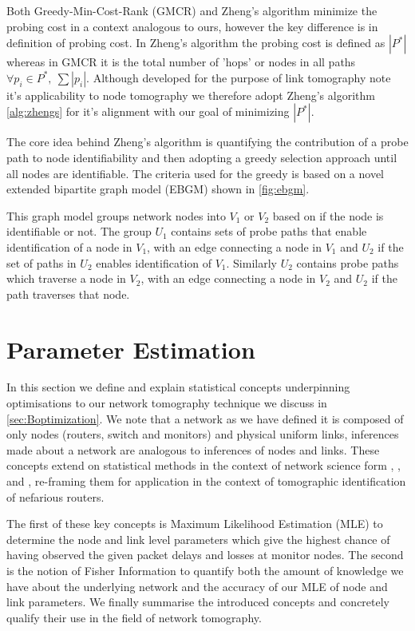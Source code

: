 Both Greedy-Min-Cost-Rank (GMCR) and Zheng's algorithm minimize the probing cost in a context analogous to ours, however the key difference is in definition of probing cost. In Zheng's algorithm the probing cost is defined as $|P^*|$ whereas in GMCR it is the total number of 'hops' or nodes in all paths $\forall p_i\in P^*,\ \sum |p_i|$. Although developed for the purpose of link tomography \cite{zheng_minimizing_2013} note it's applicability to node tomography we therefore adopt Zheng's algorithm \cref{alg:zhengs} for it's alignment with our goal of minimizing $|P^*|$.\par
The core idea behind Zheng's algorithm is quantifying the contribution of a probe path to node identifiability and then adopting a greedy selection approach until all nodes are identifiable. The criteria used for the greedy is based on a novel extended bipartite graph model (EBGM) shown in \cref{fig:ebgm}.\par
This graph model groups network nodes into $V_1$ or $V_2$ based on if the node is identifiable or not. The group $U_1$ contains sets of probe paths that enable identification of a node in $V_1$, with an edge connecting a node in $V_1$ and $U_2$ if the set of paths in $U_2$ enables identification of $V_1$. Similarly $U_2$ contains probe paths which traverse a node in $V_2$, with an edge connecting a node in $V_2$ and $U_2$ if the path traverses that node.

\section{Parameter Estimation}
\label{sec:Bparameterestimation}

In this section we define and explain statistical concepts underpinning optimisations to our network tomography technique we discuss in \cref{sec:Boptimization}. We note that a network as we have defined it is composed of only nodes (routers, switch and monitors) and physical uniform links, inferences made about a network are analogous to inferences of nodes and links. These concepts extend on statistical methods in the context of network science form \cite{meng_method_2016}, \cite{he_fisher_2015}, and \cite{he_network_2021}, re-framing them for application in the context of tomographic identification of nefarious routers.\par
The first of these key concepts is Maximum Likelihood Estimation (MLE) to determine the node and link level parameters which give the highest chance of having observed the given packet delays and losses at monitor nodes. The second is the notion of Fisher Information to quantify both the amount of knowledge we have about the underlying network and the accuracy of our MLE of node and link parameters. We finally summarise the introduced concepts and concretely qualify their use in the field of network tomography.

